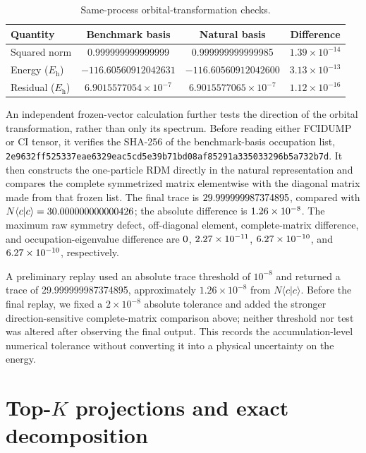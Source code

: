 \documentclass[aps,onecolumn,superscriptaddress,nofootinbib,longbibliography]{revtex4-2}
\newcommand{\Eh}{E_{\mathrm h}}
\begin{document}
\begin{table}[h]
\caption{Same-process orbital-transformation checks.}
\label{tab:natural-gates}
\begin{ruledtabular}
\begin{tabular}{lccc}
Quantity & Benchmark basis & Natural basis & Difference \\
\hline
Squared norm & 0.999999999999999 & 0.999999999999985 & \(1.39\times10^{-14}\) \\
Energy (\(\Eh\)) & \(-116.60560912042631\) & \(-116.60560912042600\) & \(3.13\times10^{-13}\) \\
Residual (\(\Eh\)) & \(6.9015577054\times10^{-7}\) & \(6.9015577065\times10^{-7}\) & \(1.12\times10^{-16}\) \\
\end{tabular}
\end{ruledtabular}
\end{table}

An independent frozen-vector calculation further tests the direction of the
orbital transformation, rather than only its spectrum.  Before reading either
FCIDUMP or CI tensor, it verifies the SHA-256 of the benchmark-basis occupation
list, 
\texttt{2e9632ff525337eae6329eac5cd5e39b71bd08af85291a335033296b5a732b7d}.
It then constructs the one-particle RDM directly in the natural representation
and compares the complete symmetrized matrix elementwise with the diagonal
matrix made from that frozen list.  The final trace is
\(29.999999987374895\), compared with
\(N\langle c|c\rangle=30.000000000000426\); the absolute difference
is \(1.26\times10^{-8}\).  The maximum raw symmetry defect,
off-diagonal element, complete-matrix difference, and occupation-eigenvalue
difference are \(0\),
\(2.27\times10^{-11}\),
\(6.27\times10^{-10}\), and
\(6.27\times10^{-10}\), respectively.

A preliminary replay used an absolute trace threshold of \(10^{-8}\) and
returned a trace of 29.999999987374895, approximately
\(1.26\times10^{-8}\) from \(N\langle c|c\rangle\).  Before the final replay,
we fixed a \(2\times10^{-8}\) absolute tolerance and added the stronger
direction-sensitive complete-matrix comparison above; neither threshold nor
test was altered after observing the final output.  This records the
accumulation-level numerical tolerance without converting it into a physical
uncertainty on the energy.

\section{Top-\texorpdfstring{\(K\)}{K} projections and exact decomposition}
\end{document}
